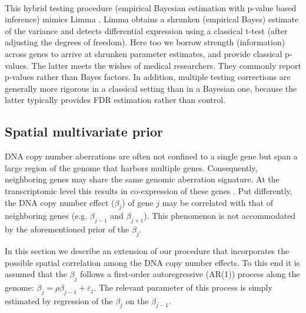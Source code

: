 \\
This hybrid testing procedure (empirical Bayesian estimation with p-value based inference) mimics Limma \cite{Smyth2004, Robinson2010}. Limma obtains a shrunken (empirical Bayes) estimate of the variance and detects differential expression using a classical t-test (after adjusting the degrees of freedom). Here too we borrow strength (information) across genes to arrive at shrunken parameter estimates, and provide classical p-values. The latter meets the wishes of medical researchers. They commonly report p-values rather than Bayes factors. In addition, multiple testing corrections are generally more rigorous in a classical setting than in a Bayesian one, because the latter typically provides FDR estimation rather than control.

\subsection{Spatial multivariate prior} \label{spatial}
DNA copy number aberrations are often not confined to a single gene but span a large region of the genome that harbors multiple genes. Consequently, neighboring genes may share the same genomic aberration signature. At the transcriptomic level this results in co-expression of these genes \cite{Wessel2010}. Put differently, the DNA copy number effect ($\beta_j$) of gene $j$ may be correlated with that of neighboring genes (e.g. $\beta_{j-1}$ and $\beta_{j+1}$). This phenomenon is not accommodated by the aforementioned prior of the $\beta_j$.

In this section we describe an extension of our procedure that incorporates the possible spatial correlation among the DNA copy number effects. To this end it is assumed that the $\beta_j$ follows a first-order autoregressive (AR(1)) process along the genome: $\beta_j = \rho \beta_{j-1} + \varepsilon_j$. The relevant parameter of this process is simply estimated by regression of the $\beta_j$ on the $\beta_{j-1}$.

